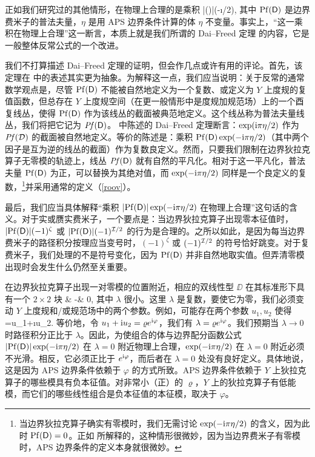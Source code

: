 正如我们研究过的其他情形，在物理上合理的是乘积
\be\label{durf}|\Pf(\DD)|\exp(-\i\pi\eta/2), \ee
其中 ${\mathrm{Pf}}({\sf D})$ 是边界费米子的普法夫量，$\eta$ 是用 APS 边界条件计算的体 $\eta$ 不变量。事实上，“这一乘积在物理上合理”这一断言，本质上就是我们所谓的 Dai--Freed 定理 \cite{DF} 的内容，它是一般整体反常公式的一个改进。


我们不打算描述 Dai--Freed 定理的证明，但会作几点或许有用的评论。首先，该定理在 \cite{DF} 中的表述其实更为抽象。为解释这一点，我们应当说明：关于反常的通常数学观点是，尽管 ${\mathrm{Pf}}({\sf D})$ 不能被自然地定义为一个复数、或定义为 $Y$ 上度规的复值函数，但总存在 $Y$ 上度规空间（在更一般情形中是度规加规范场）上的一个酉复线丛，使得 ${\mathrm{Pf}}({\sf D})$ 作为该线丛的截面被典范地定义。这个线丛称为普法夫量线丛，我们将把它记为 ${\mathit {Pf}}({\sf D})$。\cite{DF} 中陈述的 Dai--Freed 定理断言：$\exp({\mathrm i}\pi\eta/2)$ 作为 ${\mathit {Pf}}({\mathcal D})$ 的截面被自然地定义。等价的陈述是：乘积 ${\mathrm{Pf}}({\sf D})\exp(-{\mathrm i}\pi\eta/2)$（其中两个因子是互为逆的线丛的截面）作为复数良定义。然而，只要我们限制在边界狄拉克算子无零模的轨迹上，线丛 ${\mathit {Pf}}({\sf D})$ 就有自然的平凡化。相对于这一平凡化，普法夫量 ${\mathrm{Pf}}({\sf D})$ 为正，可以替换为其绝对值，而 $\exp(-{\mathrm i}\pi\eta/2)$ 同样是一个良定义的复数，\footnote{当边界狄拉克算子确实有零模时，我们无需讨论 $\exp(-{\mathrm i}\pi\eta/2)$ 的含义，因为此时 ${\mathrm{Pf}}({\sf D})=0$。正如 \cite{DF} 所解释的，这种情形很微妙，因为当边界费米子有零模时，APS 边界条件的定义本身就很微妙。}并采用通常的定义（\ref{roov}）。

最后，我们应当具体解释“乘积 $|{\mathrm{Pf}}({\sf D})|\exp(-{\mathrm i}\pi\eta/2)$ 在物理上合理”这句话的含义。对于实或赝实费米子，一个要点是：当边界狄拉克算子出现零本征值时，$|{\mathrm{Pf}}({\sf D})|(-1)^\zeta$ 或 $|{\mathrm{Pf}}({\sf D})|(-1)^{{\mathcal I}/2}$ 的行为是合理的。之所以如此，是因为每当边界费米子的路径积分按理应当变号时，$(-1)^\zeta$ 或 $(-1)^{{\mathcal I}/2}$ 的符号恰好跳变。对于复费米子，我们处理的不是符号变化，因为 ${\mathrm{Pf}}({\sf D})$ 并非自然地取实值。但弄清零模出现时会发生什么仍然至关重要。

在边界狄拉克算子出现一对零模的位置附近，相应的双线性型 $\DD$ 在其标准形下具有一个 $2\times 2$ 块
\be\label{zumo} & \lambda \cr -\lambda & 0\ep, \ee
其中 $\lambda$ 很小。这里 $\lambda$ 是复数，要使它为零，我们必须变动 $Y$ 上度规和/或规范场中的两个参数。例如，可能存在两个参数 $u_1,u_2$ 使得
\be\label{umo}\lambda=u_1+\i u_2. \ee
等价地，令 $u_1+{\mathrm i} u_2=\varrho e^{{\mathrm i}\varphi}$，我们有 $\lambda=\varrho e^{{\mathrm i}\varphi}$。我们预期当 $\lambda\to 0$ 时路径积分正比于 $\lambda$。因此，为使组合的体与边界配分函数公式 $|{\mathrm{Pf}}({\sf D})|\exp(-{\mathrm i}\pi\eta/2)$ 在 $\lambda=0$ 附近物理上合理，$\exp(-{\mathrm i}\pi\eta/2)$ 在 $\lambda=0$ 附近必须不光滑。相反，它必须正比于 $e^{{\mathrm i}\varphi}$，而后者在 $\lambda=0$ 处没有良好定义。具体地说，这是因为 APS 边界条件依赖于 $\varphi$ 的方式所致。APS 边界条件依赖于 $Y$ 上狄拉克算子的哪些模具有负本征值。对非常小（正）的 $\varrho$，$Y$ 上的狄拉克算子有低能模，而它们的哪些线性组合是负本征值的本征模，取决于 $\varphi$。

